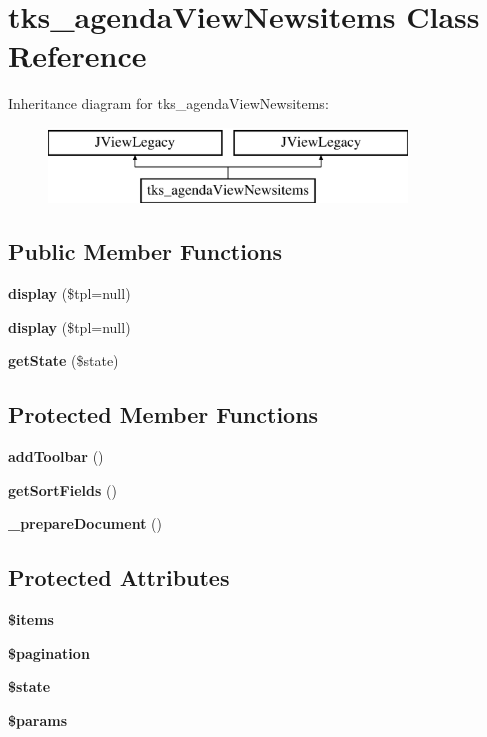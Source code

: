 \section{tks\+\_\+agenda\+View\+Newsitems Class Reference}
\label{classtks__agenda_view_newsitems}
Inheritance diagram for tks\+\_\+agenda\+View\+Newsitems\+:\begin{figure}[H]
\begin{center}
\leavevmode
\includegraphics[height=2.000000cm]{classtks__agenda_view_newsitems}
\end{center}
\end{figure}
\subsection*{Public Member Functions}
\begin{DoxyCompactItemize}
\item 
\textbf{ display} (\$tpl=null)
\item 
\textbf{ display} (\$tpl=null)
\item 
\textbf{ get\+State} (\$state)
\end{DoxyCompactItemize}
\subsection*{Protected Member Functions}
\begin{DoxyCompactItemize}
\item 
\textbf{ add\+Toolbar} ()
\item 
\textbf{ get\+Sort\+Fields} ()
\item 
\textbf{ \+\_\+prepare\+Document} ()
\end{DoxyCompactItemize}
\subsection*{Protected Attributes}
\begin{DoxyCompactItemize}
\item 
\textbf{ \$items}
\item 
\textbf{ \$pagination}
\item 
\textbf{ \$state}
\item 
\textbf{ \$params}
\end{DoxyCompactItemize}


